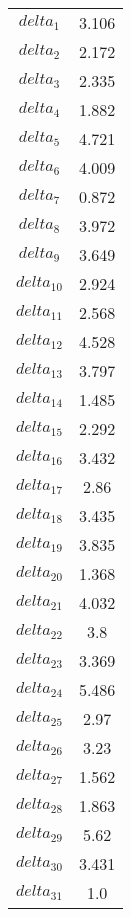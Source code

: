 \begin{tabular}{cc}
\toprule 
$delta_{1}$ & 3.106 \\
$delta_{2}$ & 2.172 \\
$delta_{3}$ & 2.335 \\
$delta_{4}$ & 1.882 \\
$delta_{5}$ & 4.721 \\
$delta_{6}$ & 4.009 \\
$delta_{7}$ & 0.872 \\
$delta_{8}$ & 3.972 \\
$delta_{9}$ & 3.649 \\
$delta_{10}$ & 2.924 \\
$delta_{11}$ & 2.568 \\
$delta_{12}$ & 4.528 \\
$delta_{13}$ & 3.797 \\
$delta_{14}$ & 1.485 \\
$delta_{15}$ & 2.292 \\
$delta_{16}$ & 3.432 \\
$delta_{17}$ & 2.86 \\
$delta_{18}$ & 3.435 \\
$delta_{19}$ & 3.835 \\
$delta_{20}$ & 1.368 \\
$delta_{21}$ & 4.032 \\
$delta_{22}$ & 3.8 \\
$delta_{23}$ & 3.369 \\
$delta_{24}$ & 5.486 \\
$delta_{25}$ & 2.97 \\
$delta_{26}$ & 3.23 \\
$delta_{27}$ & 1.562 \\
$delta_{28}$ & 1.863 \\
$delta_{29}$ & 5.62 \\
$delta_{30}$ & 3.431 \\
$delta_{31}$ & 1.0 \\
\bottomrule 
\end{tabular}
